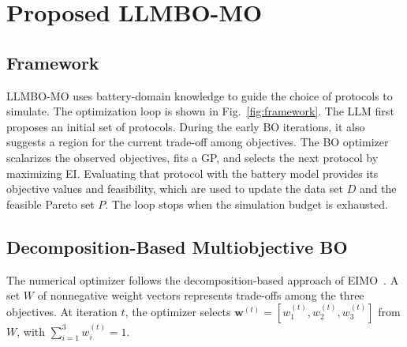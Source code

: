 
\section{Proposed LLMBO-MO}
\label{sec:method}

\subsection{Framework}
\label{sec:framework}

LLMBO-MO uses battery-domain knowledge to guide the choice of protocols to
simulate. The optimization loop is shown in Fig.~\ref{fig:framework}. The LLM
first proposes an initial set of protocols. During the early BO iterations,
it also suggests a region for the current trade-off among objectives. The BO
optimizer scalarizes the observed objectives, fits a GP, and selects the next
protocol by maximizing EI. Evaluating that protocol with the battery model
provides its objective values and feasibility, which are used to update the
data set $D$ and the feasible Pareto set $P$. The loop stops when the
simulation budget is exhausted.

\subsection{Decomposition-Based Multiobjective BO}
\label{sec:parego_backbone}

The numerical optimizer follows the decomposition-based approach of
EIMO~\cite{refEIMO}. A set $W$ of nonnegative weight vectors represents
trade-offs among the three objectives. At iteration $t$, the optimizer selects
$\mathbf w^{(t)}=[w_1^{(t)},w_2^{(t)},w_3^{(t)}]$ from $W$, with
$\sum_{i=1}^{3}w_i^{(t)}=1$.

